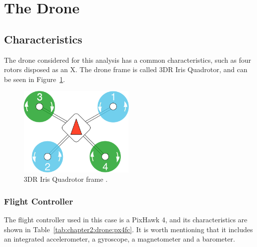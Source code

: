 \section{The Drone}
\label{sec:chapter2:drone}
\subsection{Characteristics}
\label{subsec:chapter2:drone:characteristics}
The drone considered for this analysis has a common characteristics, such as four rotors disposed as an X. The drone frame is called 3DR Iris Quadrotor, and can be seen in Figure~\ref{fig:chapter2:drone:frame}.

\begin{figure}
    \centering
    \includegraphics[width=0.5\textwidth]{Images/fig4-quad-frame.png}
    \caption[3DR Iris Quadrotor frame.]{3DR Iris Quadrotor frame \cite{mavros}.}
    \label{fig:chapter2:drone:frame}
\end{figure}

\subsubsection{Flight Controller}
The flight controller used in this case is a PixHawk 4, and its characteristics are shown in Table~\ref{tab:chapter2:drone:px4fc}. It is worth mentioning that it includes an integrated accelerometer, a gyroscope, a magnetometer and a barometer.

